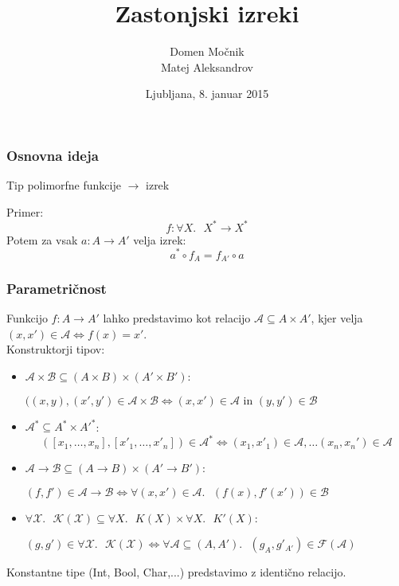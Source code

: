 \documentclass{beamer}
\title{Zastonjski izreki}
\author{Domen Močnik\\
Matej Aleksandrov}
\date{Ljubljana, 8. januar 2015}
\begin{document}
\begin{frame}
	\titlepage
	\end{frame}
	
	
	\begin{frame}
	\frametitle{Osnovna ideja}
	\begin{center}
	Tip polimorfne funkcije $\rightarrow$ izrek
	\end{center}
	\pause
	Primer:
	\\
	$$f: \forall X .\mbox{ } X^* \rightarrow X^*$$
	\pause
	Potem za vsak $a: A \rightarrow A'$ velja izrek:
	$$  a^* \circ f_{A} = f_{A'} \circ a $$
	\end{frame}
	
	\begin{frame}
	\frametitle{Parametričnost}
		Funkcijo $f:A \to A'$ lahko predstavimo kot relacijo $\mathcal{A} \subseteq A \times A'$, kjer velja $(x,x')\in \mathcal{A} \Leftrightarrow  f(x)=x'$.\\ \pause
		Konstruktorji tipov:\pause
		\begin{itemize}
		\item $\mathcal{A}\times \mathcal{B} \subseteq (A \times B) \times (A' \times B')$:
		 \begin{center} $((x,y),(x',y') \in \mathcal{A}\times \mathcal{B} \Leftrightarrow (x,x') \in \mathcal{A} \mbox{ in } (y,y') \in \mathcal{B} $ \end{center} \pause
		\item $\mathcal{A}^* \subseteq A^* \times A'^*$:
		$$ ([x_1, \ldots, x_n],[x'_1, \ldots, x'_n]) \in \mathcal{A}^* \Leftrightarrow (x_1,x'_1) \in \mathcal{A},  \ldots  (x_n,x_n') \in \mathcal{A} $$ \pause
		\vspace{-0.5cm}
		\item $\mathcal{A}\to \mathcal{B} \subseteq (A \to B) \times (A' \to B')$:
		 \begin{center} $ (f,f') \in \mathcal{A}\to \mathcal{B} \Leftrightarrow  \forall (x,x') \in \mathcal{A}.\mbox{ } (f(x),f'(x')) \in \mathcal{B} $  \end{center} \pause
		\item $\forall \mathcal{X}.\mbox{ } \mathcal{K}(\mathcal{X}) \subseteq \forall X.\mbox{ } K(X) \times \forall X.\mbox{ } K'(X) $:
		 \begin {center}$ (g,g') \in \forall \mathcal{X}.\mbox{ } \mathcal{K}(\mathcal{X})  \Leftrightarrow  \forall \mathcal{A} \subseteq (A,A').\mbox{ } (g_A,g'_{A'}) \in \mathcal{F}(\mathcal{A})$  \end{center}
		\end{itemize}
\pause
	Konstantne tipe (Int, Bool, Char,...) predstavimo z identično relacijo.
	\end{frame}
	
\end{document}
